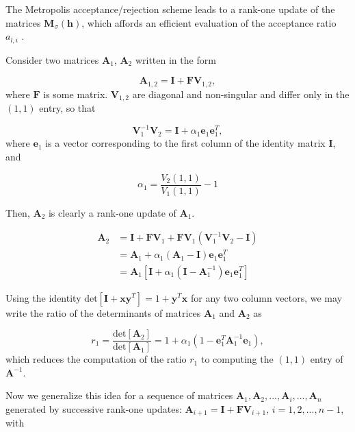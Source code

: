 The Metropolis acceptance/rejection scheme leads to a rank-one update of the matrices $\bm M_\sigma (\bm h)$, which affords an efficient evaluation of the acceptance ratio $a_{l, i}$ \cite{hou_numerical_2009}.

Consider two matrices $\bm A_1$, $\bm A_2$ written in the form

\begin{equation}
\bm A_{1,2} = \bm I + \bm F \bm V_{1,2} ,
\end{equation}
where $\bm F$ is some matrix. $\bm V_{1,2}$ are diagonal and non-singular and differ only in the $(1,1)$ entry, so that

\begin{equation}
\bm V_1^{-1} \bm V_2 = \bm I + \alpha_1 \bm e_1 \bm e_1^T ,
\end{equation}
where $\bm e_1$ is a vector corresponding to the first column of the identity matrix $\bm I$, and

\begin{equation*}
\alpha_1 = \frac{V_2(1,1)}{V_1(1,1)} - 1
\end{equation*}

Then, $\bm A_2$ is clearly a rank-one update of $\bm A_1$.

\begin{equation*}
\begin{split}
\bm A_2 &= \bm I + \bm F \bm V_1 + \bm F \bm V_1 ( \bm V_1^{-1} \bm V_2 - \bm I ) \\
&= \bm A_1 + \alpha_1 ( \bm A_1 - \bm I ) \bm e_1 \bm e_1^T \\
&= \bm A_1 [ \bm I + \alpha_1 ( \bm I - \bm A_1^{-1} )\bm e_1 \bm e_1^T ]
\end{split}
\end{equation*}

Using the identity $\text{det}[\bm I + \bm x \bm y^T] = 1 + \bm y^T \bm x$ for any two column vectors, we may write the ratio of the determinants of matrices $\bm A_1$ and $\bm A_2$ as

\begin{equation}\label{eq:efRatio}
r_1 = \frac{\text{det}[\bm A_2]}{\text{det}[\bm A_1]} = 1 + \alpha_1 ( 1 - \bm e_1^T \bm A_1^{-1} \bm e_1 ) ,
\end{equation}
which reduces the computation of the ratio $r_1$ to computing the $(1,1)$ entry of $\bm A^{-1}$.

Now we generalize this idea for a sequence of matrices $\bm A_1, \bm A_2, ..., \bm A_i, ..., \bm A_n$ generated by successive rank-one updates: $\bm A_{i+1} = \bm I + \bm F \bm V_{i+1}, \, i = 1, 2, ..., n-1$, with

